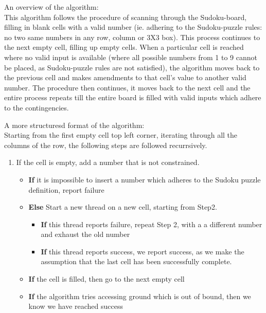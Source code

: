 \documentclass[12pt]{article}
\begin{document}
\begin{flushleft}
An overview of the algorithm:\\
This algorithm follows the procedure of scanning through the Sudoku-board, filling in blank cells with a valid number (ie. adhering to the Sudoku-puzzle rules: no two same numbers in any row, column or 3X3 box). This process continues to the next empty cell, filling up empty cells. When a particular cell is reached where no valid input is available (where all possible numbers from 1 to 9 cannot be placed, as Sudoku-puzzle rules are not satisfied), the algorithm moves back to the previous cell and makes amendments to that cell's value to another valid number. The procedure then continues, it moves back to the next cell and the entire process repeats till the entire board is filled with valid inputs which adhere to the contingencies. 
\end{flushleft}

\begin{flushleft}
A more structuresd format of the algorithm: \\
Starting from the first empty cell top left corner, iterating through all the columns of the row, the following steps are followed recurrsively. \\
\begin{enumerate}
\item If the cell is empty, add a number that is not constrained.
\begin{itemize}
\item \textbf{If} it is impossible to insert a number which adheres to the Sudoku puzzle definition, report failure 
\item \textbf{Else} Start a new thread on a new cell, starting from Step2.
\begin{itemize}
\item \textbf{If} this thread reports failure, repeat Step 2, with a a different number and exhaust the old number
\item \textbf{If} this thread reports success, we report success, as we make the assumption that the last cell has been successfully complete.  
\end{itemize}
\item \textbf{If} the cell is filled, then go to the next empty cell
\item \textbf{If} the algorithm tries accessing ground which is out of bound, then we know we have reached success
\end{itemize}
\end{enumerate}
\end{flushleft}
\end{document}

